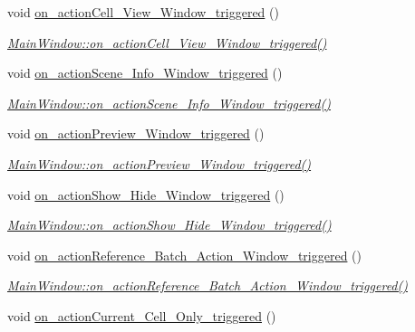 \begin{DoxyCompactItemize}
void \hyperlink{class_main_window_acca897b6aa864947f35e22163eb6a0a7}{on\+\_\+action\+Cell\+\_\+\+View\+\_\+\+Window\+\_\+triggered} ()
\begin{DoxyCompactList}\small\item\em \hyperlink{class_main_window_acca897b6aa864947f35e22163eb6a0a7}{Main\+Window\+::on\+\_\+action\+Cell\+\_\+\+View\+\_\+\+Window\+\_\+triggered()} \end{DoxyCompactList}\item 
void \hyperlink{class_main_window_a5e8eef1130ab17d4f10ae161eb372bc8}{on\+\_\+action\+Scene\+\_\+\+Info\+\_\+\+Window\+\_\+triggered} ()
\begin{DoxyCompactList}\small\item\em \hyperlink{class_main_window_a5e8eef1130ab17d4f10ae161eb372bc8}{Main\+Window\+::on\+\_\+action\+Scene\+\_\+\+Info\+\_\+\+Window\+\_\+triggered()} \end{DoxyCompactList}\item 
void \hyperlink{class_main_window_ad39efdb57cad0ee03b2491037fa6b5c0}{on\+\_\+action\+Preview\+\_\+\+Window\+\_\+triggered} ()
\begin{DoxyCompactList}\small\item\em \hyperlink{class_main_window_ad39efdb57cad0ee03b2491037fa6b5c0}{Main\+Window\+::on\+\_\+action\+Preview\+\_\+\+Window\+\_\+triggered()} \end{DoxyCompactList}\item 
void \hyperlink{class_main_window_a3de1a7a9eb5798b608bdb9fad1a442b5}{on\+\_\+action\+Show\+\_\+\+Hide\+\_\+\+Window\+\_\+triggered} ()
\begin{DoxyCompactList}\small\item\em \hyperlink{class_main_window_a3de1a7a9eb5798b608bdb9fad1a442b5}{Main\+Window\+::on\+\_\+action\+Show\+\_\+\+Hide\+\_\+\+Window\+\_\+triggered()} \end{DoxyCompactList}\item 
void \hyperlink{class_main_window_a162cfcb7e13f7d350c9246e2a084eb6b}{on\+\_\+action\+Reference\+\_\+\+Batch\+\_\+\+Action\+\_\+\+Window\+\_\+triggered} ()
\begin{DoxyCompactList}\small\item\em \hyperlink{class_main_window_a162cfcb7e13f7d350c9246e2a084eb6b}{Main\+Window\+::on\+\_\+action\+Reference\+\_\+\+Batch\+\_\+\+Action\+\_\+\+Window\+\_\+triggered()} \end{DoxyCompactList}\item 
void \hyperlink{class_main_window_a58acaabf35d71b094d373c5a8f4f333a}{on\+\_\+action\+Current\+\_\+\+Cell\+\_\+\+Only\+\_\+triggered} ()

\end{DoxyCompactItemize}
